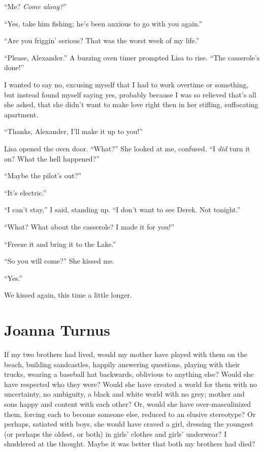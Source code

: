 ``Me? \emph{Come along?}''

``Yes, take him fishing; he's been anxious to go with you again.''

``Are you friggin' serious? That was the worst week of my life.''

``Please, Alexander.'' A buzzing oven timer prompted Lisa to rise. ``The
casserole's done!''

\enlargethispage{1\baselineskip}

 I wanted to say no, excusing myself that I had to work overtime or
something, but instead found myself saying yes, probably because I was
so relieved that's all she asked, that she didn't want to make love
right then in her stifling, suffocating apartment.

``Thanks, Alexander, I'll make it up to you!''

Lisa opened the oven door. ``What?'' She looked at me, confused. ``I
\emph{did} turn it on? What the hell happened?''

``Maybe the pilot's out?''

``It's electric.''

``I can't stay,'' I said, standing up. ``I don't want to see Derek. Not
tonight.''

``What? What about the casserole? I made it for you!''

``Freeze it and bring it to the Lake.''

``So you will come?'' She kissed me.

``Yes.''

We kissed again, this time a little longer.

\chapter{Joanna Turnus}

\titlemark

If my two brothers had lived, would my mother have played with them on
the beach, building sandcastles, happily answering questions, playing
with their trucks, wearing a baseball hat backwards, oblivious to
anything else? Would she have respected who they were? Would she have
created a world for them with no uncertainty, no ambiguity, a black and
white world with no grey; mother and sons happy and content with each
other? Or, would she have over-masculinized them, forcing each to become
someone else, reduced to an elusive stereotype? Or perhaps, satiated
with boys, she would have craved a girl, dressing the youngest (or
perhaps the oldest, or both) in girls' clothes and girls' underwear? I
shuddered at the thought. Maybe it was better that both my brothers had
died?

